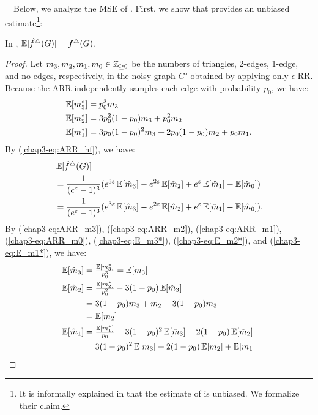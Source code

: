 \smallskip
{}~~Below, we analyze the MSE of \AlgARRTri{}.
First, we show that \AlgARRTri{} provides an unbiased estimate\footnote{It is informally explained in \cite{Imola_USENIX22} that the estimate of \AlgARRTri{} is unbiased. We formalize their claim.}:
\begin{theorem}
\label{chap3-thm:unbiased_ARR}
In \AlgARRTri{}, $\operatorname{\mathbb{E}}[\hat{f}^\triangle(G)] = f^\triangle(G)$.
\end{theorem}
\begin{proof}
Let $m_3, m_2, m_1, m_0 \in \mathbb{Z}_{\ge0}$ be the numbers of triangles, 2-edges, 1-edge, and no-edges, respectively, in the noisy graph $G'$ obtained by applying only $\epsilon$-RR.
Because the ARR independently samples each edge with probability $p_0$, we have:
\begin{align}
\operatorname{\mathbb{E}}[m_3^*] &= p_0^3 m_3 \label{chap3-eq:E_m3*}\\
\operatorname{\mathbb{E}}[m_2^*] &= 3 p_0^2 (1 - p_0) m_3 + p_0^2 m_2 \label{chap3-eq:E_m2*}\\
\operatorname{\mathbb{E}}[m_1^*] &= 3 p_0 (1 - p_0)^2 m_3 + 2 p_0 (1 - p_0) m_2 + p_0 m_1. \label{chap3-eq:E_m1*}
\end{align}
By (\ref{chap3-eq:ARR_hf}), we have:
\begin{align}
& \operatorname{\mathbb{E}}[\hat{f}^\triangle(G)] \nonumber\\
&= \frac{1}{(e^\varepsilon-1)^3}(e^{3\varepsilon} \operatorname{\mathbb{E}}[\hat{m}_3] - e^{2\varepsilon} \operatorname{\mathbb{E}}[\hat{m}_2] + e^\varepsilon \operatorname{\mathbb{E}}[\hat{m}_1] - \operatorname{\mathbb{E}}[\hat{m}_0]) \nonumber\\
&= \frac{1}{(e^\varepsilon-1)^3}(e^{3\varepsilon} \operatorname{\mathbb{E}}[\hat{m}_3] - e^{2\varepsilon} \operatorname{\mathbb{E}}[\hat{m}_2] + e^\varepsilon \operatorname{\mathbb{E}}[\hat{m}_1] - \operatorname{\mathbb{E}}[\hat{m}_0]). \label{chap3-eq:E_hf_triangle_G}
\end{align}
By (\ref{chap3-eq:ARR_m3}), (\ref{chap3-eq:ARR_m2}), (\ref{chap3-eq:ARR_m1}), (\ref{chap3-eq:ARR_m0}), (\ref{chap3-eq:E_m3*}), (\ref{chap3-eq:E_m2*}), and (\ref{chap3-eq:E_m1*}), we have:
\begin{align*}
\E[\hat{m}_3]
&= \textstyle{\frac{\E[m_3^*]}{p_0^3}}
= \E[m_3] \\
\E[\hat{m}_2]
&= \textstyle{\frac{\E[m_2^*]}{p_0^2} - 3(1-p_0)\E[\hat{m}_3]} \\
&= 3 (1 - p_0) m_3 + m_2 - 3(1-p_0)m_3 \\
&= \E[m_2] \\
\E[\hat{m}_1]
&= \textstyle{\frac{\E[m_1^*]}{p_0} - 3(1-p_0)^2\E[\hat{m}_3] - 2(1-p_0)\E[\hat{m}_2]} \\
&= 3 (1 - p_0)^2 \E[m_3] + 2 (1 - p_0) \E[m_2] + \E[m_1] \\

\end{align*}
\end{proof}
